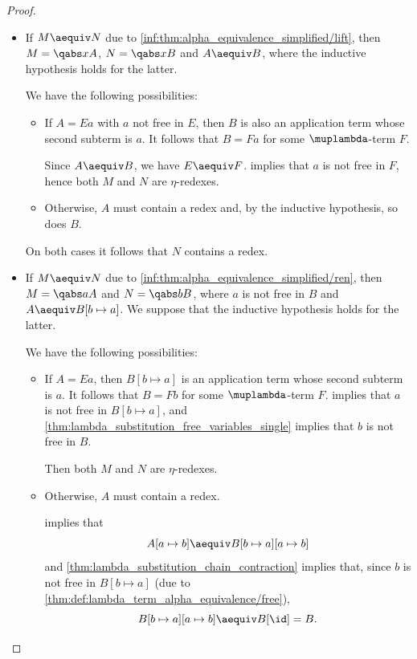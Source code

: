 \begin{proof}
\begin{itemize}
    \item If \( M \aequiv N \) due to \ref{inf:thm:alpha_equivalence_simplified/lift}, then \( M = \qabs x A \), \( N = \qabs x B \) and \( A \aequiv B \), where the inductive hypothesis holds for the latter.

    We have the following possibilities:
    \begin{itemize}
      \item If \( A = Ea \) with \( a \) not free in \( E \), then \( B \) is also an application term whose second subterm is \( a \). It follows that \( B = Fa \) for some \( \muplambda \)-term \( F \).

      Since \( A \aequiv B \), we have \( E \aequiv F \).  implies that \( a \) is not free in \( F \), hence both \( M \) and \( N \) are \( \eta \)-redexes.

      \item Otherwise, \( A \) must contain a redex and, by the inductive hypothesis, so does \( B \).
    \end{itemize}

    On both cases it follows that \( N \) contains a redex.

    \item If \( M \aequiv N \) due to \ref{inf:thm:alpha_equivalence_simplified/ren}, then \( M = \qabs a A \) and \( N = \qabs b B \), where \( a \) is not free in \( B \) and \( A \aequiv B[b \mapsto a] \). We suppose that the inductive hypothesis holds for the latter.

    We have the following possibilities:
    \begin{itemize}
      \item If \( A = Ea \), then \( B[b \mapsto a] \) is an application term whose second subterm is \( a \). It follows that \( B = Fb \) for some \( \muplambda \)-term \( F \).  implies that \( a \) is not free in \( B[b \mapsto a] \), and \cref{thm:lambda_substitution_free_variables_single} implies that \( b \) is not free in \( B \).

      Then both \( M \) and \( N \) are \( \eta \)-redexes.

      \item Otherwise, \( A \) must contain a redex.

       implies that
      \begin{equation*}
        A[a \mapsto b] \aequiv B[b \mapsto a][a \mapsto b]
      \end{equation*}
      and \cref{thm:lambda_substitution_chain_contraction} implies that, since \( b \) is not free in \( B[b \mapsto a] \) (due to \cref{thm:def:lambda_term_alpha_equivalence/free}),
      \begin{equation*}
        B[b \mapsto a][a \mapsto b] \aequiv B[\id] = B.
      \end{equation*}


\end{itemize}
\end{itemize}
\end{proof}

